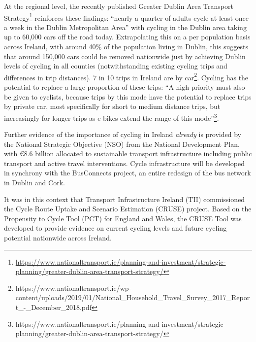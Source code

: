 \documentclass[
  super,
  preprint,
  3p]{elsarticle}
\begin{document}
At the regional level, the recently published Greater Dublin Area
Transport Strategy\footnote{\url{https://www.nationaltransport.ie/planning-and-investment/strategic-planning/greater-dublin-area-transport-strategy/}}
reinforces these findings: ``nearly a quarter of adults cycle at least
once a week in the Dublin Metropolitan Area'' with cycling in the Dublin
area taking up to 60,000 cars off the road today. Extrapolating this on
a per population basis across Ireland, with around 40\% of the
population living in Dublin, this suggests that around 150,000 cars
could be removed nationwide just by achieving Dublin levels of cycling
in all counties (notwithstanding existing cycling trips and differences
in trip distances). 7 in 10 trips in Ireland are by car\footnote{
  https://www.nationaltransport.ie/wp-content/uploads/2019/01/National\_Household\_Travel\_Survey\_2017\_Report\_-\_December\_2018.pdf}.
Cycling has the potential to replace a large proportion of these trips:
``A high priority must also be given to cyclists, because trips by this
mode have the potential to replace trips by private car, most
specifically for short to medium distance trips, but increasingly for
longer trips as e-bikes extend the range of this mode''\footnote{
  https://www.nationaltransport.ie/planning-and-investment/strategic-planning/greater-dublin-area-transport-strategy/}.

Further evidence of the importance of cycling in Ireland \emph{already}
is provided by the National Strategic Objective (NSO) from the National
Development Plan, with €8.6 billion allocated to sustainable transport
infrastructure including public transport and active travel
interventions. Cycle infrastructure will be developed in synchrony with
the BusConnects project, an entire redesign of the bus network in Dublin
and Cork.

It was in this context that Transport Infrastructure Ireland (TII)
commissioned the Cycle Route Uptake and Scenario Estimation (CRUSE)
project. Based on the Propensity to Cycle Tool (PCT) for England and
Wales, the CRUSE Tool was developed to provide evidence on current
cycling levels and future cycling potential nationwide across Ireland.
\end{document}
